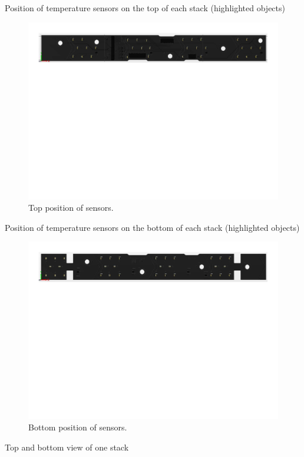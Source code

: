 Position of temperature sensors on the top of each stack (highlighted objects)
\begin{figure}[H]
	\centering
	\includegraphics[width=\textwidth,trim={0cm 16cm 0cm 0cm}, clip]{./img/BMS-top-sensors.pdf}
	\caption{Top position of sensors.}
	\label{fig:BMS-top}
\end{figure}
Position of temperature sensors on the bottom of each stack (highlighted objects)
\begin{figure}[H]
	\centering
	\includegraphics[width=\textwidth,trim={0cm 16cm 0cm 0cm}, clip]{./img/BMS-bottom-sensors.pdf}
	\caption{Bottom position of sensors.}
	\label{fig:bms-bottom}
\end{figure}
Top and bottom view of one stack 
